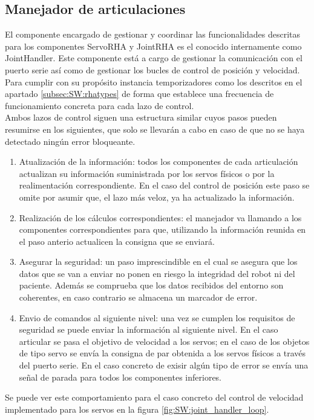    \subsection{Manejador de articulaciones} \label{subsec:SW:joint_handler}
        El componente encargado de gestionar y coordinar las funcionalidades descritas para los componentes ServoRHA y JointRHA es el conocido internamente como JointHandler. Este componente está a cargo de gestionar la comunicación con el puerto serie así como de gestionar los bucles de control de posición y velocidad.
        \\
        Para cumplir con su propósito instancia temporizadores como los descritos en el apartado \ref{subsec:SW:rhatypes} de forma que establece una frecuencia de funcionamiento concreta para cada lazo de control.
        \\
        Ambos lazos de control siguen una estructura similar cuyos pasos pueden resumirse en los siguientes, que solo se llevarán a cabo en caso de que no se haya detectado ningún error bloqueante.
        \begin{enumerate}
            \item Atualización de la información: todos los componentes de cada articulación actualizan su información suministrada por los servos físicos o por la realimentación correspondiente. En el caso del control de posición este paso se omite por asumir que, el lazo más veloz, ya ha actualizado la información.
            \item Realización de los cálculos correspondientes: el manejador va llamando a los componentes correspondientes para que, utilizando la información reunida en el paso anterio actualicen la consigna que se enviará.
            \item Asegurar la seguridad: un paso imprescindible en el cual se asegura que los datos que se van a enviar no ponen en riesgo la integridad del robot ni del paciente. Además se comprueba que los datos recibidos del entorno son coherentes, en caso contrario se almacena un marcador de error.
            \item Envio de comandos al siguiente nivel: una vez se cumplen los requisitos de seguridad se puede enviar la información al siguiente nivel. En el caso articular se pasa el objetivo de velocidad a los servos; en el caso de los objetos de tipo servo se envía la consigna de par obtenida a los servos físicos a través del puerto serie. En el caso concreto de exisir algún tipo de error se envía una señal de parada para todos los componentes inferiores.
        \end{enumerate}
        Se puede ver este comportamiento para el caso concreto del control de velocidad implementado para los servos en la figura \ref{fig:SW:joint_handler_loop}.

